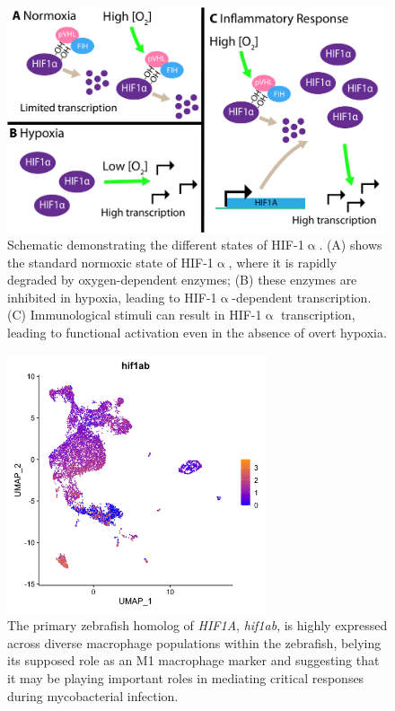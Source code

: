 \begin{figure}
\centering
\includegraphics[width=\textwidth]{images/hifreg.pdf}
\caption[HIF-1$\upalpha$ regulatory mechanisms]{Schematic demonstrating the different states of HIF\hyp{}1$\upalpha$. (A) shows the standard normoxic state of HIF\hyp{}1$\upalpha$, where it is rapidly degraded by oxygen\hyp{}dependent enzymes; (B) these enzymes are inhibited in hypoxia, leading to HIF\hyp{}1$\upalpha$\hyp{}dependent transcription. (C) Immunological stimuli can result in HIF\hyp{}1$\upalpha$ transcription, leading to functional activation even in the absence of overt hypoxia.}
\label{figure:hif}
\end{figure}

\begin{figure}
\centering
\includegraphics[height=3in]{images/wtCombo_hif1ab_GEPlot.png}
\caption[scRNA-seq expression data for \textit{hif1ab}]{The primary zebrafish homolog of \textit{HIF1A}, \textit{hif1ab}, is highly expressed across diverse macrophage populations within the zebrafish, belying its supposed role as an M1 macrophage marker and suggesting that it may be playing important roles in mediating critical responses during mycobacterial infection.}
\label{figure:schif1ab}
\end{figure}


